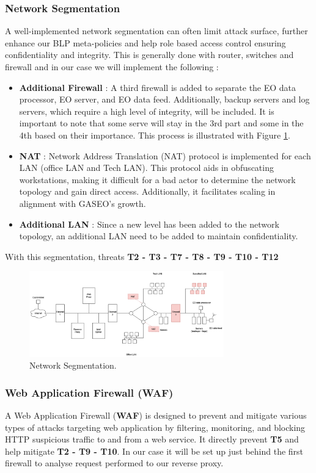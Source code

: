 \documentclass[12pt]{article}
\begin{document}
\subsubsection*{Network Segmentation}
A well-implemented network segmentation can often limit attack surface, further enhance our BLP meta-policies and help role based access control ensuring confidentiality and integrity. This is generally done with router, switches and firewall and in our case we will implement the following : 
\begin{itemize}
    \item \textbf{Additional Firewall} : A third firewall is added to separate the EO data processor, EO server, and EO data feed. Additionally, backup servers and log servers, which require a high level of integrity, will be included. It is important to note that some serve will stay in the 3rd part and some in the 4th based on their importance. This process is illustrated with Figure 
     \ref{fig:firewall_nat}.
    \item \textbf{NAT} : Network Address Translation (NAT) protocol is implemented for each LAN (office LAN and Tech LAN). This protocol aids in obfuscating workstations, making it difficult for a bad actor to determine the network topology and gain direct access. Additionally, it facilitates scaling in alignment with GASEO's growth.
    \item \textbf{Additional LAN} : Since a new level has been added to the network topology, an additional LAN need to be added to maintain confidentiality. 
\end{itemize}

With this segmentation, threats \textbf{T2 - T3 - T7 - T8 - T9 - T10 - T12}

\begin{figure}[h]
    \centering
    \includegraphics[width=0.75\textwidth]{Figures/Solutions/firewall_nat_lan.png}
    \caption{Network Segmentation.}
    \label{fig:firewall_nat}
\end{figure}

\newpage
\subsubsection*{Web Application Firewall (WAF)}
A Web Application Firewall (\textbf{WAF}) is designed to prevent and mitigate various types of attacks targeting web application by filtering, monitoring, and blocking HTTP suspicious traffic to and from a web service. It directly prevent \textbf{T5} and help mitigate \textbf{T2 - T9 - T10}. In our case it will be set up just behind the first firewall to analyse request performed to our reverse proxy.
\end{document}
